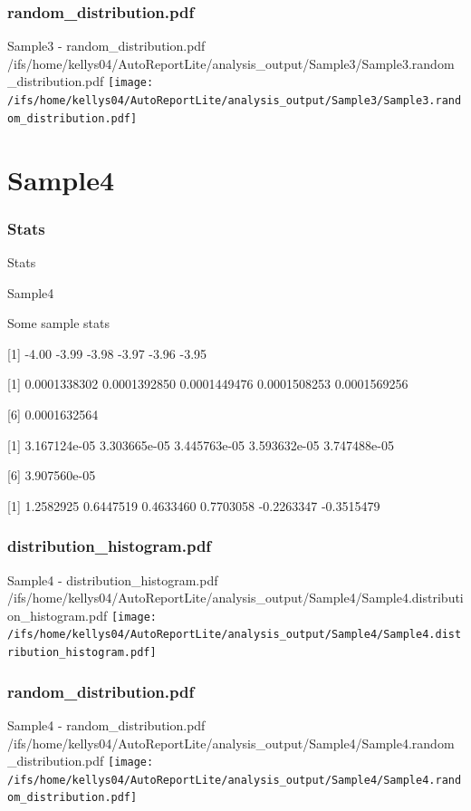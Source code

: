 \documentclass[8pt]{beamer}\usepackage[]{graphicx}\usepackage[]{color}
\begin{document}
\subsubsection{random\_distribution.pdf}
\begin{frame}{Sample3 - random\_distribution.pdf }
\scriptsize{/ifs/home/kellys04/AutoReportLite/analysis\_output/Sample3/Sample3.random\_distribution.pdf}
\texttt{[image: /ifs/home/kellys04/AutoReportLite/analysis\_output/Sample3/Sample3.random\_distribution.pdf]}
\end{frame}

\section{Sample4}
\subsubsection{Stats}
\begin{frame}{Stats }
\small{
Sample4 

Some sample stats

[1] -4.00 -3.99 -3.98 -3.97 -3.96 -3.95

[1] 0.0001338302 0.0001392850 0.0001449476 0.0001508253 0.0001569256

[6] 0.0001632564

[1] 3.167124e-05 3.303665e-05 3.445763e-05 3.593632e-05 3.747488e-05

[6] 3.907560e-05

[1]  1.2582925  0.6447519  0.4633460  0.7703058 -0.2263347 -0.3515479
}

\end{frame}

\subsubsection{distribution\_histogram.pdf}
\begin{frame}{Sample4 - distribution\_histogram.pdf }
\scriptsize{/ifs/home/kellys04/AutoReportLite/analysis\_output/Sample4/Sample4.distribution\_histogram.pdf}
\texttt{[image: /ifs/home/kellys04/AutoReportLite/analysis\_output/Sample4/Sample4.distribution\_histogram.pdf]}
\end{frame}

\subsubsection{random\_distribution.pdf}
\begin{frame}{Sample4 - random\_distribution.pdf }
\scriptsize{/ifs/home/kellys04/AutoReportLite/analysis\_output/Sample4/Sample4.random\_distribution.pdf}
\texttt{[image: /ifs/home/kellys04/AutoReportLite/analysis\_output/Sample4/Sample4.random\_distribution.pdf]}
\end{frame}
\end{document}
